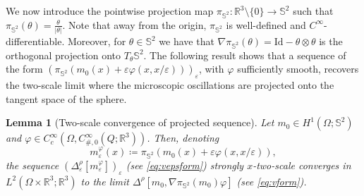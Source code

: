 \documentclass[reqno,11pt]{amsart}
\numberwithin{equation}{section}
\theoremstyle{thmlemcorr}
\numberwithin{theorem}{section}
\newtheorem{lemma}[theorem]{Lemma}
\theoremstyle{thmlemcorr*}
\theoremstyle{defi}
\theoremstyle{remexample}
\theoremstyle{ass}
\newcommand{\R}{\mathbb{R}}
\renewcommand{\S}{\mathbb{S}}
\renewcommand{\epsilon}{\varepsilon}
\newcommand{\1}{\mathds{1}}
\newcommand{\Om}{\Omega}
\newcommand{\veps}{\varepsilon}
\newcommand{\hidde}[1]{{\textcolor{orange}{$\langle\hspace{-0.3ex}\langle$Hidde: #1$\rangle\hspace{-0.3ex}\rangle$}}}
\begin{document}
We now introduce the pointwise projection map $\pi_{\S^2} : \R^3 \setminus \{ 0 \} \to \S^2$ such that $ \pi_{\S^2}(\theta) = \frac{\theta}{|\theta|}$. Note that away from the origin, $\pi_{\S^2}$ is well-defined and $C^{\infty}$-differentiable. Moreover, for $\theta \in \S^2$ we have that $\nabla \pi_{\S^2}(\theta)=\mathrm{Id} - \theta \otimes \theta$ is the orthogonal projection onto $T_\theta \S^2$. The following result shows that a sequence of the form $(\pi_{\S^2}(m_0(x)+\veps \varphi(x,x/\veps)))_\veps$, with $\varphi$ sufficiently smooth, recovers the two-scale limit where the microscopic oscillations are projected onto the tangent space of the sphere. 
\begin{lemma}[Two-scale convergence of projected sequence]\label{lem:sts_recov}
    Let $m_0 \in H^1(\Omega;\S^2)$ and \(\varphi \in C_c^\infty(\Om, C^\infty_{\#,0}(Q;\R^3))\). Then, denoting 
    \begin{equation*}
        m_\veps^\varphi(x)\coloneqq \pi_{\S^2}(m_0(x)+\veps \varphi(x,x/\veps)),
    \end{equation*}
    the sequence $(\Delta_\epsilon^\rho[m_\veps^\varphi])_\veps$ (see \eqref{eq:vepsform}) strongly $x$-two-scale converges in $L^2(\Omega\times\R^3;\R^3)$ to the limit \(\Delta^\rho[m_0,\nabla \pi_{\S^2}(m_0)\varphi]\) (see \eqref{eq:vform}).
\end{lemma}
\end{document}
